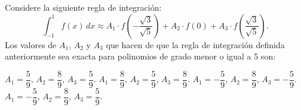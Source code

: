 \begin{pregunta}
\begin{cuerpo}
Considere la siguiente regla de integraci\'on:
$$
\int_{-1}^{1}f(x)\,dx\approx  A_1 \cdot f\left(-\dfrac{\sqrt{3}}{\sqrt{5}}\right) + A_2 \cdot f\left(0\right) + A_3 \cdot f\left(\dfrac{\sqrt{3}}{\sqrt{5}}\right).
$$
Los valores de $A_1$, $A_2$ y $A_3$ que hacen de que la regla de integraci\'on definida anteriormente sea exacta para polinomios de grado menor o igual a 5 son:
\end{cuerpo}
\begin{multicols}{2}
\begin{alternativas}
{$A_1=\dfrac{5}{9}$, $A_2=\dfrac{8}{9}$, $A_3=\dfrac{5}{9}$.}
{$A_1=\dfrac{8}{9}$, $A_2=\dfrac{5}{9}$, $A_3=\dfrac{8}{9}$.}
{$A_1=-\dfrac{5}{9}$, $A_2=\dfrac{8}{9}$, $A_3=-\dfrac{5}{9}$.}
{$A_1=-\dfrac{5}{9}$, $A_2=\dfrac{8}{9}$, $A_3=\dfrac{5}{9}$.}
\end{alternativas}
\end{multicols}
\justificacion{9cm}
\end{pregunta}